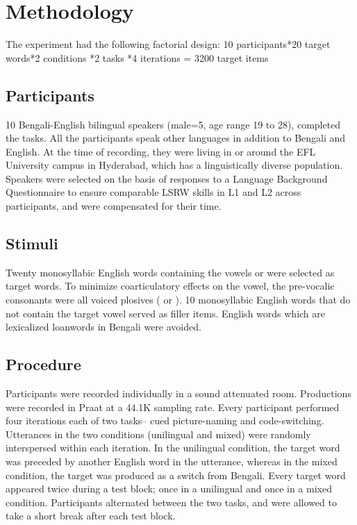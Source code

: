 \documentclass[charis,linguex]{glossa}
\newcommand{\nt}[1]{\textipa{[#1]}} %
\begin{document}
\section{Methodology} 
The experiment had the following factorial design: 10 participants*20 target words*2 conditions *2 tasks *4 iterations = 3200 target items

\subsection{Participants}

10 Bengali-English bilingual speakers (male=5, age range 19 to 28), completed the tasks. All the participants speak other languages in addition to Bengali and English. At the time of recording, they were living in or around the EFL University campus in Hyderabad, which has a linguistically diverse population. Speakers were selected on the basis of responses to a Language Background Questionnaire to ensure comparable LSRW skills in L1 and L2 across participants, and were compensated for their time.


\subsection{Stimuli}
Twenty monosyllabic English words containing the vowels \nt{2} or \nt{ae} were selected as target words. To minimize coarticulatory effects on the vowel, the pre-vocalic consonants were all voiced plosives (\nt{b} or \nt{d}). 10 monosyllabic English words that do not contain the target vowel served as filler items. English words which are lexicalized loanwords in Bengali were avoided. %



\subsection{Procedure}
Participants were recorded individually in a sound attenuated room. %
Productions were recorded in Praat \citep{boersma2016praat} at a 44.1K sampling rate. Every participant performed four iterations each of two tasks-- cued picture-naming and code-switching. Utterances in the two conditions (unilingual and mixed) were randomly interspersed within each iteration. In the unilingual condition, the target word was preceded by another English word in the utterance, whereas in the mixed condition, the target was produced as a switch from Bengali. Every target word appeared twice during a test block; once in a unilingual and once in a mixed condition. Participants alternated between the two tasks, and were allowed to take a short break after each test block.
\end{document}
